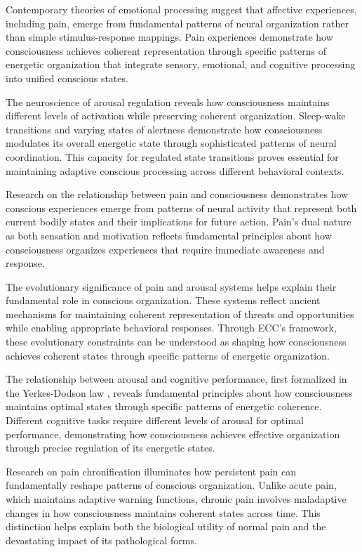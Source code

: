 \begin{refsection}
Contemporary theories of emotional processing \cite{Barrett2009} suggest that affective experiences, including pain, emerge from fundamental patterns of neural organization rather than simple stimulus-response mappings. Pain experiences demonstrate how consciousness achieves coherent representation through specific patterns of energetic organization that integrate sensory, emotional, and cognitive processing into unified conscious states.

The neuroscience of arousal regulation \cite{Saper2010} reveals how consciousness maintains different levels of activation while preserving coherent organization. Sleep-wake transitions and varying states of alertness demonstrate how consciousness modulates its overall energetic state through sophisticated patterns of neural coordination. This capacity for regulated state transitions proves essential for maintaining adaptive conscious processing across different behavioral contexts.

Research on the relationship between pain and consciousness \cite{Damasio2013} demonstrates how conscious experiences emerge from patterns of neural activity that represent both current bodily states and their implications for future action. Pain's dual nature as both sensation and motivation reflects fundamental principles about how consciousness organizes experiences that require immediate awareness and response.

The evolutionary significance of pain and arousal systems \cite{Melzack1965} helps explain their fundamental role in conscious organization. These systems reflect ancient mechanisms for maintaining coherent representation of threats and opportunities while enabling appropriate behavioral responses. Through ECC's framework, these evolutionary constraints can be understood as shaping how consciousness achieves coherent states through specific patterns of energetic organization.

The relationship between arousal and cognitive performance, first formalized in the Yerkes-Dodson law \cite{Yerkes1908}, reveals fundamental principles about how consciousness maintains optimal states through specific patterns of energetic coherence. Different cognitive tasks require different levels of arousal for optimal performance, demonstrating how consciousness achieves effective organization through precise regulation of its energetic states.

Research on pain chronification \cite{Tracey2007} illuminates how persistent pain can fundamentally reshape patterns of conscious organization. Unlike acute pain, which maintains adaptive warning functions, chronic pain involves maladaptive changes in how consciousness maintains coherent states across time. This distinction helps explain both the biological utility of normal pain and the devastating impact of its pathological forms.


\end{refsection}
